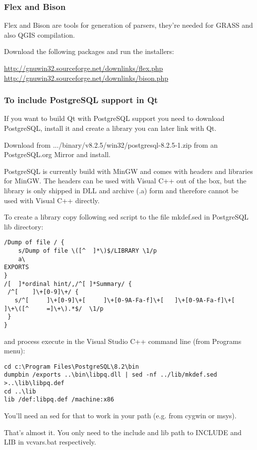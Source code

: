 \subsubsection{Flex and Bison}
Flex and Bison are tools for generation of parsers, they're needed for GRASS and also QGIS compilation.

Download the following packages and run the installers:

\url{http://gnuwin32.sourceforge.net/downlinks/flex.php} \\
\url{http://gnuwin32.sourceforge.net/downlinks/bison.php}

\subsubsection{To include  PostgreSQL support in Qt}
If you want to build Qt with PostgreSQL support you need to download
PostgreSQL, install it and create a library you can later link with Qt.

Download from .../binary/v8.2.5/win32/postgresql-8.2.5-1.zip from an
PostgreSQL.org Mirror and install.

PostgreSQL is currently build with MinGW and comes with headers and libraries
for MinGW.  The headers can be used with Visual C++ out of the box, but the library
is only shipped in DLL and archive (.a) form and therefore cannot be used with
Visual C++ directly.

To create a library copy following sed script to the file mkdef.sed in
PostgreSQL lib directory:

\begin{verbatim}
/Dump of file / {
	s/Dump of file \([^	 ]*\)$/LIBRARY \1/p
	a\
EXPORTS
}
/[ 	]*ordinal hint/,/^[	]*Summary/ {
 /^[ 	]\+[0-9]\+/ {
   s/^[ 	]\+[0-9]\+[ 	]\+[0-9A-Fa-f]\+[ 	]\+[0-9A-Fa-f]\+[ 	]\+\([^ 	=]\+\).*$/	\1/p
 }
}
\end{verbatim}

and process execute in the Visual Studio C++ command line (from Programs menu):

\begin{verbatim}
cd c:\Program Files\PostgreSQL\8.2\bin
dumpbin /exports ..\bin\libpq.dll | sed -nf ../lib/mkdef.sed >..\lib\libpq.def
cd ..\lib
lib /def:libpq.def /machine:x86
\end{verbatim}

You'll need an sed for that to work in your path (e.g. from cygwin or msys).

That's almost it. You only need to the include and lib path to INCLUDE and LIB in vcvars.bat respectively.


